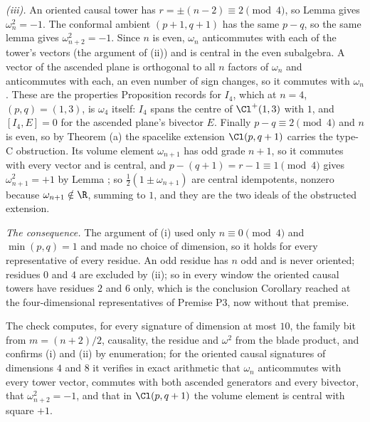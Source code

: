 \emph{(iii).} An oriented causal tower has $r = \pm(n - 2) \equiv 2 \pmod 4$, so Lemma  gives $\omega_{n}^{2} = -1$. The conformal ambient $(p+1, q+1)$ has the same $p - q$, so the same lemma gives $\omega_{n+2}^{2} = -1$. Since $n$ is even, $\omega_{n}$ anticommutes with each of the tower's vectors (the argument of (ii)) and is central in the even subalgebra. A vector of the ascended plane is orthogonal to all $n$ factors of $\omega_{n}$ and anticommutes with each, an even number of sign changes, so it commutes with $\omega_{n}$. These are the properties Proposition  records for $I_{4}$, which at $n = 4$, $(p,q) = (1,3)$, is $\omega_{4}$ itself: $I_{4}$ spans the centre of $\Cl^{+}(1,3)$ with $1$, and $[I_{4}, E] = 0$ for the ascended plane's bivector $E$. Finally $p - q \equiv 2 \pmod 4$ and $n$ is even, so by Theorem (a) the spacelike extension $\Cl(p, q+1)$ carries the type-C obstruction. Its volume element $\omega_{n+1}$ has odd grade $n + 1$, so it commutes with every vector and is central, and $p - (q+1) = r - 1 \equiv 1 \pmod 4$ gives $\omega_{n+1}^{2} = +1$ by Lemma ; so $\tfrac12(1 \pm \omega_{n+1})$ are central idempotents, nonzero because $\omega_{n+1} \notin \R$, summing to $1$, and they are the two ideals of the obstructed extension.

\emph{The consequence.} The argument of (i) used only $n \equiv 0 \pmod 4$ and $\min(p,q) = 1$ and made no choice of dimension, so it holds for every representative of every residue. An odd residue has $n$ odd and is never oriented; residues $0$ and $4$ are excluded by (ii); so in every window the oriented causal towers have residues $2$ and $6$ only, which is the conclusion Corollary  reached at the four-dimensional representatives of Premise P3, now without that premise.

The check computes, for every signature of dimension at most $10$, the family bit from $m = (n+2)/2$, causality, the residue and $\omega^{2}$ from the blade product, and confirms (i) and (ii) by enumeration; for the oriented causal signatures of dimensions $4$ and $8$ it verifies in exact arithmetic that $\omega_{n}$ anticommutes with every tower vector, commutes with both ascended generators and every bivector, that $\omega_{n+2}^{2} = -1$, and that in $\Cl(p, q+1)$ the volume element is central with square $+1$.
